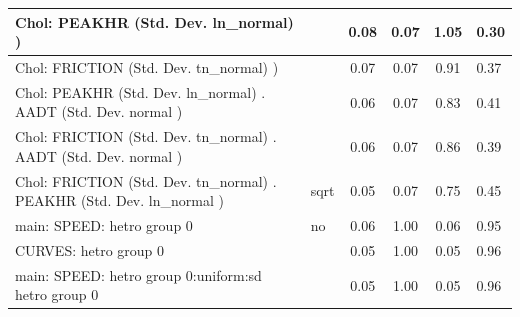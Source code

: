 \begin{table}
\begin{center}
\begin{tabular}{|l|l|c|c|c|l|}
			\hline
			 Chol: PEAKHR (Std. Dev. ln_normal) ) &  & 0.08 & 0.07 & 1.05 & 0.30 \\
			\hline
			 Chol: FRICTION (Std. Dev. tn_normal) ) &  & 0.07 & 0.07 & 0.91 & 0.37 \\
			\hline
			 Chol: PEAKHR (Std. Dev. ln_normal) . AADT (Std. Dev.   normal ) &  & 0.06 & 0.07 & 0.83 & 0.41 \\
			\hline
			 Chol: FRICTION (Std. Dev. tn_normal) . AADT (Std. Dev.   normal ) &  & 0.06 & 0.07 & 0.86 & 0.39 \\
			\hline
			 Chol: FRICTION (Std. Dev. tn_normal) . PEAKHR (Std. Dev.   ln_normal ) & sqrt & 0.05 & 0.07 & 0.75 & 0.45 \\
			\hline
			main: SPEED: hetro group 0 & no & 0.06 & 1.00 & 0.06 & 0.95 \\
			\hline
			CURVES: hetro group 0 &  & 0.05 & 1.00 & 0.05 & 0.96 \\
			\hline
			main: SPEED: hetro group 0:uniform:sd  hetro group 0 &  & 0.05 & 1.00 & 0.05 & 0.96 \\
			\hline
		\end{tabular}
	\end{center}
\end{table}